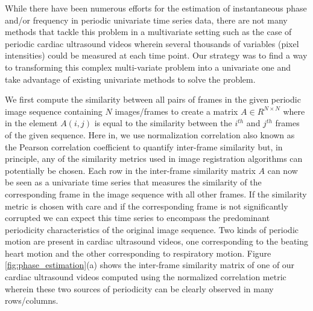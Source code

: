 \documentclass[runningheads,a4paper]{llncs}
\begin{document}
%
While there have been numerous efforts for the estimation of instantaneous phase and/or frequency in periodic univariate time series data\cite{Boashash1992,Lu2013,Luo2003}, there are not many methods that tackle this problem in a multivariate setting such as the case of periodic cardiac ultrasound videos wherein several thousands of variables (pixel intensities) could be measured at each time point. Our strategy was to find a way to transforming this complex multi-variate problem into a univariate one and take advantage of existing univariate methods to solve the problem. 

	We first compute the similarity between all pairs of frames in the given periodic image sequence containing $N$ images/frames to create a matrix $A \in R^{N \times N}$ where in the element $A(i,j)$ is equal to the similarity between the $i^{th}$ and $j^{th}$ frames of the given sequence. Here in, we use normalization correlation also known as the Pearson correlation coefficient to quantify inter-frame similarity but, in principle, any of the similarity metrics used in image registration algorithms \cite{Goshtasby2012} can potentially be chosen. Each row in the inter-frame similarity matrix $A$ can now be seen as a univariate time series that measures the similarity of the corresponding frame in the image sequence with all other frames. If the similarity metric is chosen with care and if the corresponding frame is not significantly corrupted we can expect this time series to encompass the predominant periodicity characteristics of the original image sequence. Two kinds of periodic motion are present in cardiac ultrasound videos, one corresponding to the beating heart motion and the other corresponding to respiratory motion. Figure \ref{fig:phase_estimation}(a) shows the inter-frame similarity matrix of one of our cardiac ultrasound videos computed using the normalized correlation metric wherein these two sources of periodicity can be clearly observed in many rows/columns. 
\end{document}
